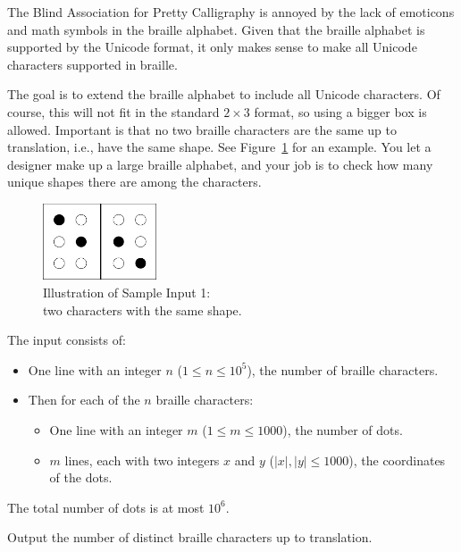

\newcommand{\maxn}{10^5}
\newcommand{\maxm}{1000}
\newcommand{\maxc}{1000}
\newcommand{\maxdots}{10^6}

The Blind Association for Pretty Calligraphy is annoyed by the lack of emoticons and math symbols in the braille alphabet.
Given that the braille alphabet is supported by the Unicode format,
it only makes sense to make all Unicode characters supported in braille.

The goal is to extend the braille alphabet to include all Unicode characters.
Of course, this will not fit in the standard $2 \times 3$ format, so using a bigger box is allowed.
Important is that no two braille characters are the same up to translation, i.e., have the same shape. See Figure~\ref{fig:braille} for an example.
You let a designer make up a large braille alphabet,
and your job is to check how many unique shapes there are among the characters.


\begin{figure}[h]
    \centering
    \includegraphics[width=0.3\textwidth]{graphic}
    \caption{Illustration of Sample Input 1:\\two characters with the same shape.}
    \label{fig:braille}
\end{figure}

\begin{Input}
    The input consists of:
    \begin{itemize}
        \item One line with an integer $n$ ($1\leq n\leq \maxn$), the number of braille characters.
        \item Then for each of the $n$ braille characters:
        \begin{itemize}
            \item One line with an integer $m$ ($1 \leq m \leq \maxm$), the number of dots.
            \item $m$ lines, each with two integers $x$ and $y$ ($\left| x \right|, \left| y \right| \leq \maxc$),
            the coordinates of the dots.
        \end{itemize}
    \end{itemize}
    The total number of dots is at most $\maxdots$.
\end{Input}

\begin{Output}
    Output the number of distinct braille characters up to translation.
\end{Output}
